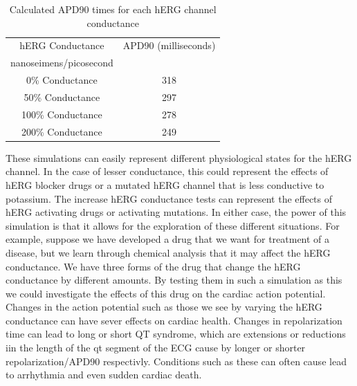 \documentclass[11pt]{article}
\begin{document}
\begin{table}[H]
	\centering
	\caption{Calculated APD90 times for each hERG channel conductance}
	\label{tab:potassium}
	\begin{tabular}{cc}
		\hline \hline
		hERG Conductance & APD90 (milliseconds)\\ 
		nanoseimens/picosecond &  \\
		\hline
		0\% Conductance & 318\\ 
		50\% Conductance &  297\\ 
		
		100\% Conductance &  278\\ 
		
		200\% Conductance&  249\\ 
		
		
		\hline 
		\hline
	\end{tabular} 
\end{table}
\par{}
These simulations can easily represent different physiological states for the hERG channel. In the case of lesser conductance, this could represent the effects of hERG blocker drugs or a mutated hERG channel that is less conductive to potassium. The increase hERG conductance tests can represent the effects of hERG activating drugs or activating mutations. In either case, the power of this simulation is that it allows for the exploration of these different situations. For example, suppose we have developed a drug that we want for treatment of a disease, but we learn through chemical analysis that it may affect the hERG conductance. We have three forms of the drug that change the hERG conductance by different amounts. By testing them in such a simulation as this we could investigate the effects of this drug on the cardiac action potential. Changes in the action potential such as those we see by varying the hERG conductance can have sever effects on cardiac health. Changes in repolarization time can lead to long or short QT syndrome, which are extensions or reductions iin the length of the qt segment of the ECG cause by longer or shorter repolarization/APD90 respectivly. Conditions such as these can often cause lead to arrhythmia and even sudden cardiac death. 
\end{document}
